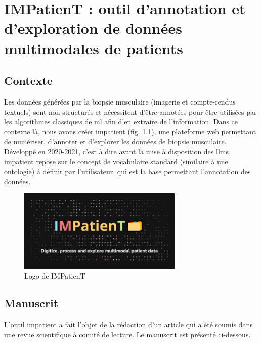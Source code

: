 \chapter{IMPatienT : outil d’annotation et d’exploration de données multimodales de patients}

\section{Contexte}
Les données générées par la biopsie musculaire (imagerie et compte-rendus textuels) sont non-structurés et nécessitent d'être annotées pour être utilisées par les algorithmes classiques de \gls{ml} afin d'en extraire de l'information. Dans ce contexte là, nous avons créer \gls{impatient} (fig. \ref{fig:impatient_logo}), une plateforme web permettant de numériser, d'annoter et d'explorer les données de biopsie musculaire. Développé en 2020-2021, c'est à dire avant la mise à disposition des \gls{llms}, \gls{impatient} repose sur le concept de vocabulaire standard (similaire à une ontologie) à définir par l'utilisateur, qui est la base permettant l'annotation des données.

\begin{figure}[htbp]
  \centering
  \includegraphics[width=0.7\textwidth]{figures/impatient_banner.png}
  \caption[Logo IMPatienT]{Logo de IMPatienT}
  \label{fig:impatient_logo}
\end{figure}


\section{Manuscrit} 
L'outil \gls{impatient} a fait l'objet de la rédaction d'un article qui a été soumis dans une revue scientifique à comité de lecture. Le manuscrit est présenté ci-dessous.


